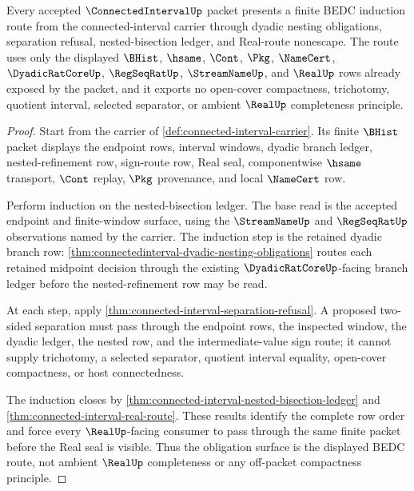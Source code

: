 \begin{theorem}
\label{thm:connected-interval-obligation-closure-route}
Every accepted $\ConnectedIntervalUp$ packet presents a finite BEDC induction route from the connected-interval carrier through dyadic nesting obligations, separation refusal, nested-bisection ledger, and Real-route nonescape. The route uses only the displayed $\BHist$, $\hsame$, $\Cont$, $\Pkg$, $\NameCert$, $\DyadicRatCoreUp$, $\RegSeqRatUp$, $\StreamNameUp$, and $\RealUp$ rows already exposed by the packet, and it exports no open-cover compactness, trichotomy, quotient interval, selected separator, or ambient $\RealUp$ completeness principle.
\end{theorem}
\begin{proof}
Start from the carrier of \autoref{def:connected-interval-carrier}. Its finite $\BHist$ packet displays the endpoint rows, interval windows, dyadic branch ledger, nested-refinement row, sign-route row, Real seal, componentwise $\hsame$ transport, $\Cont$ replay, $\Pkg$ provenance, and local $\NameCert$ row.

Perform induction on the nested-bisection ledger. The base read is the accepted endpoint and finite-window surface, using the $\StreamNameUp$ and $\RegSeqRatUp$ observations named by the carrier. The induction step is the retained dyadic branch row: \autoref{thm:connectedinterval-dyadic-nesting-obligations} routes each retained midpoint decision through the existing $\DyadicRatCoreUp$-facing branch ledger before the nested-refinement row may be read.

At each step, apply \autoref{thm:connected-interval-separation-refusal}. A proposed two-sided separation must pass through the endpoint rows, the inspected window, the dyadic ledger, the nested row, and the intermediate-value sign route; it cannot supply trichotomy, a selected separator, quotient interval equality, open-cover compactness, or host connectedness.

The induction closes by \autoref{thm:connected-interval-nested-bisection-ledger} and \autoref{thm:connected-interval-real-route}. These results identify the complete row order and force every $\RealUp$-facing consumer to pass through the same finite packet before the Real seal is visible. Thus the obligation surface is the displayed BEDC route, not ambient $\RealUp$ completeness or any off-packet compactness principle.
\end{proof}

